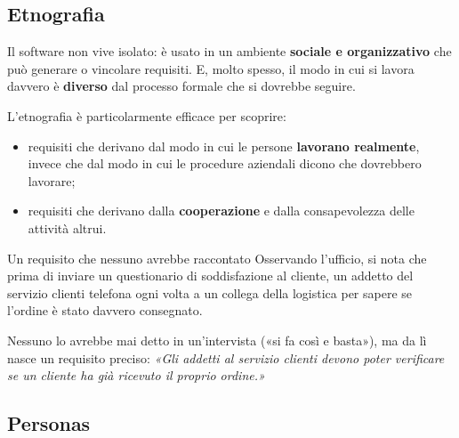 \subsection{Etnografia}


Il software non vive isolato: è usato in un ambiente \textbf{sociale e organizzativo} che può generare o vincolare requisiti.
E, molto spesso, il modo in cui si lavora davvero è \textbf{diverso} dal processo formale che si dovrebbe seguire.

L'etnografia è particolarmente efficace per scoprire:
\begin{itemize}
  \item requisiti che derivano dal modo in cui le persone \textbf{lavorano realmente}, invece che dal modo in cui le procedure
        aziendali dicono che dovrebbero lavorare;
  \item requisiti che derivano dalla \textbf{cooperazione} e dalla consapevolezza delle attività altrui.
\end{itemize}

\begin{esempio}{Un requisito che nessuno avrebbe raccontato}
Osservando l'ufficio, si nota che prima di inviare un questionario di soddisfazione al cliente, un addetto del servizio clienti
telefona ogni volta a un collega della logistica per sapere se l'ordine è stato davvero consegnato.

Nessuno lo avrebbe mai detto in un'intervista («si fa così e basta»), ma da lì nasce un requisito preciso:
\textit{«Gli addetti al servizio clienti devono poter verificare se un cliente ha già ricevuto il proprio ordine.»}
\end{esempio}

\subsection{Personas}


